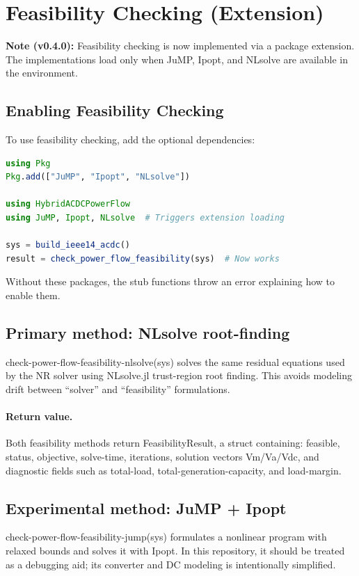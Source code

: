 \documentclass[11pt]{article}
\def\code#1{#1}%
\def\_{-}%
\newcommand{\code}[1]{\nolinkurl{#1}}
\begin{document}
\section{Feasibility Checking (Extension)}\label{sec:feasibility}

\textbf{Note (v0.4.0):} Feasibility checking is now implemented via a package extension. The implementations load only when \code{JuMP}, \code{Ipopt}, and \code{NLsolve} are available in the environment.

\subsection{Enabling Feasibility Checking}
To use feasibility checking, add the optional dependencies:
\begin{lstlisting}[language=Julia]
using Pkg
Pkg.add(["JuMP", "Ipopt", "NLsolve"])

using HybridACDCPowerFlow
using JuMP, Ipopt, NLsolve  # Triggers extension loading

sys = build_ieee14_acdc()
result = check_power_flow_feasibility(sys)  # Now works
\end{lstlisting}

Without these packages, the stub functions throw an error explaining how to enable them.

\subsection{Primary method: NLsolve root-finding}
\code{check\_power\_flow\_feasibility\_nlsolve(sys)} solves the same residual equations used by the NR solver using \code{NLsolve.jl} trust-region root finding. This avoids modeling drift between ``solver'' and ``feasibility'' formulations.

\paragraph{Return value.}
Both feasibility methods return \code{FeasibilityResult}, a struct containing:
\code{feasible}, \code{status}, \code{objective}, \code{solve\_time}, \code{iterations},
solution vectors \code{Vm/Va/Vdc}, and diagnostic fields such as \code{total\_load}, \code{total\_generation\_capacity}, and \code{load\_margin}.

\subsection{Experimental method: JuMP + Ipopt}
\code{check\_power\_flow\_feasibility\_jump(sys)} formulates a nonlinear program with relaxed bounds and solves it with Ipopt. In this repository, it should be treated as a debugging aid; its converter and DC modeling is intentionally simplified.
\end{document}
